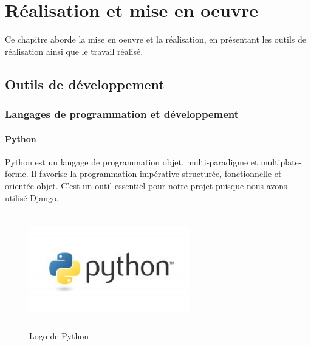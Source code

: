 \chapter{Réalisation et mise en oeuvre}
Ce chapitre aborde la mise en oeuvre et la réalisation, en présentant les outils de réalisation ainsi que le travail réalisé.
\newpage
\section{Outils de développement}
\subsection{Langages de programmation et développement}
\subsubsection*{Python}
Python est un langage de programmation objet, multi-paradigme et multiplate-forme.
Il favorise la programmation impérative structurée, fonctionnelle et orientée objet.
C'est un outil essentiel pour notre projet puisque nous avons utilisé Django.\\

\begin{figure}[h]
      \centering
        \includegraphics[width=7cm,height=5cm]{img/python.jpg}
        \caption{Logo de Python}
\end{figure}
